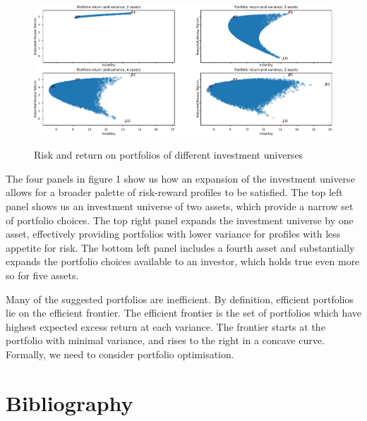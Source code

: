 \documentclass[11pt,a4paper,oneside]{article}
\begin{document}
\begin{figure}[ht]
\centering
\vspace{4mm}
\caption{Risk and return on portfolios of different investment universes}
\label{plot:pfAllocExample}
\includegraphics[scale=0.6]{images/pfAllocations.pdf}
\begingroup
\vspace{4mm}
\endgroup
\end{figure}

The four panels in figure 1 show us how an expansion of the investment universe allows for a broader palette of risk-reward profiles to be satisfied. The top left panel shows us an investment universe of two assets, which provide a narrow set of portfolio choices. The top right panel expands the investment universe by one asset, effectively providing portfolios with lower variance for profiles with less appetite for risk. The bottom left panel includes a fourth asset and substantially expands the portfolio choices available to an investor, which holds true even more so for five assets.

Many of the suggested portfolios are inefficient. By definition, efficient portfolios lie on the efficient frontier. The efficient frontier is the set of portfolios which have highest expected excess return at each variance. The frontier starts at the portfolio with minimal variance, and rises to the right in a concave curve. Formally, we need to consider portfolio optimisation.

\noindent


\section{Bibliography}
\end{document}
